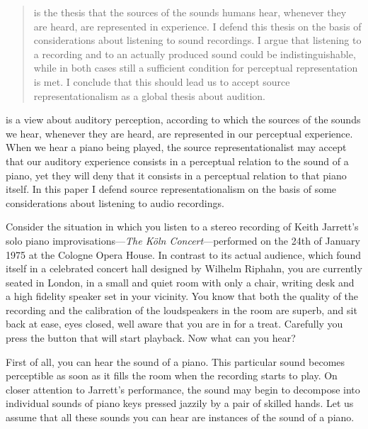 \documentclass[sloppy, journal, git, anonymise, dodraft]{humapap}
\begin{document}
\documenttitle

\begin{abstract}
 is the thesis that the sources of the sounds humans hear, whenever they are heard, are represented in experience. I defend this thesis on the basis of considerations about listening to sound recordings. I argue that listening to a recording and to an actually produced sound could be indistinguishable, while in both cases still a sufficient condition for perceptual representation is met. I conclude that this should lead us to accept source representationalism as a global thesis about audition. 
\end{abstract}	

 is a view about auditory perception,
according to which the sources of the sounds we hear, whenever they are
heard, are represented in our perceptual experience. When we hear a
piano being played, the source representationalist may accept that our
auditory experience consists in a perceptual relation to the sound of a
piano, yet they will deny that it consists in a perceptual relation to
that piano itself. In this paper I defend source representationalism on
the basis of some considerations about listening to audio recordings.



\sect Consider the situation in which you listen to a stereo recording of
Keith Jarrett's solo piano improvisations---\emph{The Köln
Concert}---performed on the 24th of January 1975 at the Cologne Opera
House. In contrast to its actual audience, which found itself in a
celebrated concert hall designed by Wilhelm Riphahn, you are currently
seated in London, in a small and quiet room with only a chair, writing
desk and a high fidelity speaker set in your vicinity. You know that
both the quality of the recording and the calibration of the
loudspeakers in the room are superb, and sit back at ease, eyes closed,
well aware that you are in for a treat. Carefully you press the button
that will start playback. Now what can you hear?



\sect First of all, you can hear the sound of a piano. This particular sound
becomes perceptible as soon as it fills the room when the recording
starts to play. On closer attention to Jarrett's performance, the sound
may begin to decompose into individual sounds of piano keys pressed
jazzily by a pair of skilled hands. Let us assume that all these sounds
you can hear are instances of the sound of a piano.
\end{document}
